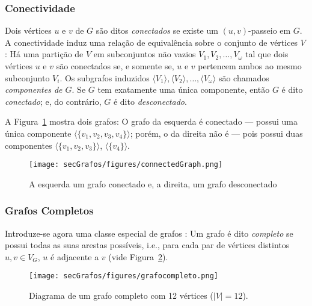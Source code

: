 \subsubsection{Conectividade}

Dois vértices $u$ e $v$ de $G$ são ditos \textit{conectados} se existe um $(u,v)$-passeio em $G$. A conectividade induz uma relação de equivalência sobre o conjunto de vértices $V$ \cite{graphTheoryApplicationsBondy}: Há uma partição de $V$ em subconjuntos não vazios $V_1, V_2, \dots, V_\omega$ tal que dois vértices $u$ e $v$ são conectados se, e somente se, $u$ e $v$ pertencem ambos ao mesmo subconjunto $V_i$. Os subgrafos induzidos $\langle V_1\rangle, \langle V_2\rangle, \dots,\langle V_\omega\rangle$ são chamados \textit{componentes de $G$}. Se $G$ tem exatamente uma única componente, então $G$ é dito \textit{conectado}; e, do contrário, $G$ é dito \textit{desconectado}. 

A Figura~\ref{fig:connectGraph} mostra dois grafos: O grafo da esquerda é conectado --- possui uma única componente $\langle \{v_1,v_2,v_3,v_4\}\rangle$; porém, o da direita não é --- pois possui duas componentes $\langle \{v_1,v_2,v_3\}\rangle$, $\langle \{v_4\}\rangle$.

\begin{figure}[H]
	\begin{center}
		\texttt{[image: secGrafos/figures/connectedGraph.png]}
	\end{center}
	\caption{A esquerda um grafo conectado e, a direita, um grafo desconectado}
	\label{fig:connectGraph}
\end{figure}


\subsubsection{Grafos Completos}

Introduze-se agora uma classe especial de grafos \cite{graphTheoryApplicationsBondy}: Um grafo é dito \textit{completo} se possui todas as suas arestas possíveis, i.e., para cada par de vértices distintos $u, v \in V_G$, $u$ é adjacente a $v$ (vide Figura~\ref{fig:grafocompleto}).

\begin{figure}[H]
	\begin{center}
		\texttt{[image: secGrafos/figures/grafocompleto.png]}
	\end{center}
	\caption{Diagrama de um grafo completo com 12 vértices ($|V| = 12$).}
	\label{fig:grafocompleto}
\end{figure}

